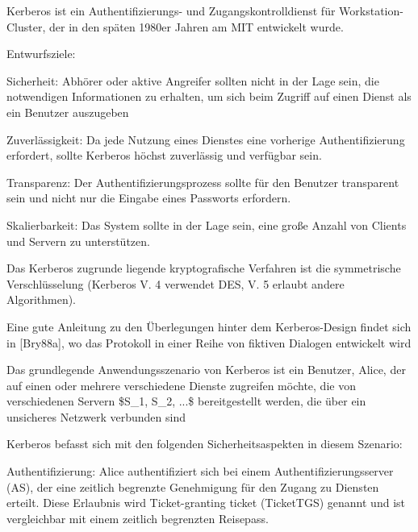\documentclass[a4paper]{article}
\begin{document}
\begin{multicols}{3}
      \begin{itemize*}
            \item Kerberos ist ein Authentifizierungs- und Zugangskontrolldienst für
            Workstation-Cluster, der in den späten 1980er Jahren am MIT entwickelt
            wurde.
            \item Entwurfsziele:
            \begin{itemize*}
                  \item Sicherheit: Abhörer oder aktive Angreifer sollten nicht in der Lage sein, die notwendigen Informationen zu erhalten, um sich beim Zugriff auf einen Dienst als ein Benutzer auszugeben
                  \item Zuverlässigkeit: Da jede Nutzung eines Dienstes eine vorherige Authentifizierung erfordert, sollte Kerberos höchst zuverlässig und verfügbar sein.
                  \item Transparenz: Der Authentifizierungsprozess sollte für den Benutzer transparent sein und nicht nur die Eingabe eines Passworts erfordern.
                  \item Skalierbarkeit: Das System sollte in der Lage sein, eine große Anzahl von Clients und Servern zu unterstützen.
            \end{itemize*}
            \item Das Kerberos zugrunde liegende kryptografische Verfahren ist die
            symmetrische Verschlüsselung (Kerberos V. 4 verwendet DES, V. 5
            erlaubt andere Algorithmen).
            \item Eine gute Anleitung zu den Überlegungen hinter dem Kerberos-Design
            findet sich in {[}Bry88a{]}, wo das Protokoll in einer Reihe von
            fiktiven Dialogen entwickelt wird
            \item Das grundlegende Anwendungsszenario von Kerberos ist ein Benutzer,
            Alice, der auf einen oder mehrere verschiedene Dienste zugreifen
            möchte, die von verschiedenen Servern \$S\_1, S\_2, ...\$
            bereitgestellt werden, die über ein unsicheres Netzwerk verbunden sind
            \item Kerberos befasst sich mit den folgenden Sicherheitsaspekten in diesem
            Szenario:
            \begin{itemize*}
                  \item Authentifizierung: Alice authentifiziert sich bei einem Authentifizierungsserver (AS), der eine zeitlich begrenzte Genehmigung für den Zugang zu Diensten erteilt. Diese Erlaubnis wird Ticket-granting ticket (TicketTGS) genannt und ist vergleichbar mit einem zeitlich begrenzten Reisepass.

\end{itemize*}
\end{itemize*}
\end{multicols}
\end{document}
